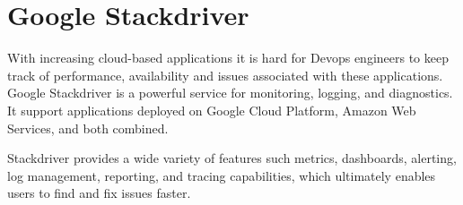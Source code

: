 \section{Google Stackdriver}

With increasing cloud-based applications it is hard for Devops engineers to keep
track of performance, availability and issues associated with these 
applications. Google Stackdriver is a powerful service for monitoring, logging, and diagnostics. It support applications deployed on Google Cloud Platform,
Amazon Web Services, and both combined.

Stackdriver provides a wide variety of features such metrics, dashboards, 
alerting, log management, reporting, and tracing capabilities, which 
ultimately enables users to find and fix issues faster. 
\cite{hid-sp18-602-google-stackdriver-main} 


